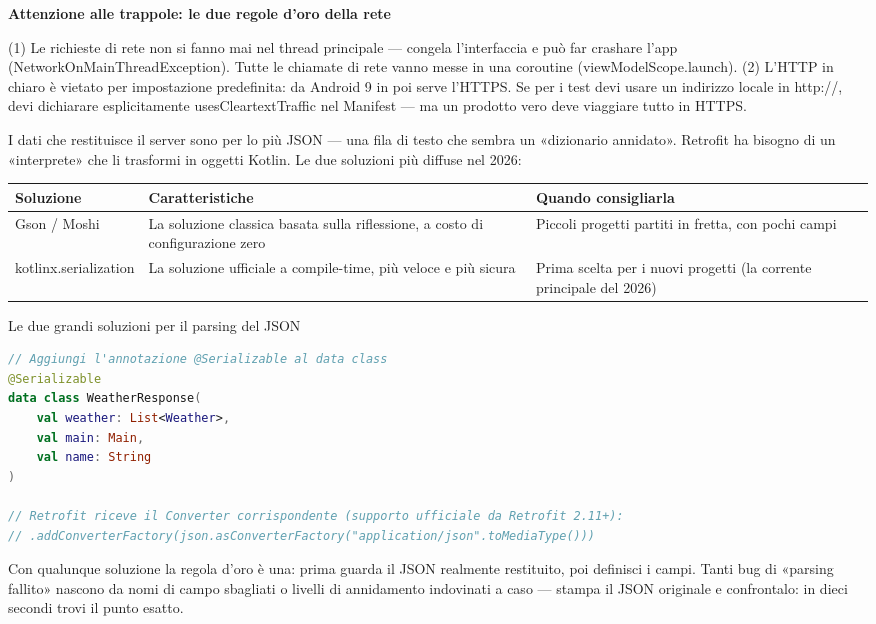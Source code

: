 \textbf{Attenzione alle trappole: le due regole d'oro della rete}\par

(1) Le richieste di rete non si fanno mai nel thread principale — congela l'interfaccia e può far crashare l'app (NetworkOnMainThreadException). Tutte le chiamate di rete vanno messe in una coroutine (viewModelScope.launch). (2) L'HTTP in chiaro è vietato per impostazione predefinita: da Android 9 in poi serve l'HTTPS. Se per i test devi usare un indirizzo locale in http://, devi dichiarare esplicitamente usesCleartextTraffic nel Manifest — ma un prodotto vero deve viaggiare tutto in HTTPS.


I dati che restituisce il server sono per lo più JSON — una fila di testo che sembra un «dizionario annidato». Retrofit ha bisogno di un «interprete» che li trasformi in oggetti Kotlin. Le due soluzioni più diffuse nel 2026:

\begin{center}
\begin{tabularx}{\linewidth}{|X|X|X|}
\hline
\textbf{Soluzione} & \textbf{Caratteristiche} & \textbf{Quando consigliarla} \tabularnewline
\hline
Gson / Moshi & La soluzione classica basata sulla riflessione, a costo di configurazione zero & Piccoli progetti partiti in fretta, con pochi campi \tabularnewline
kotlinx.serialization & La soluzione ufficiale a compile-time, più veloce e più sicura & Prima scelta per i nuovi progetti (la corrente principale del 2026) \tabularnewline
\hline
\end{tabularx}
\end{center}

\begin{center}\small\color{gray}Le due grandi soluzioni per il parsing del JSON\end{center}

\begin{lstlisting}[language=Kotlin]
// Aggiungi l'annotazione @Serializable al data class
@Serializable
data class WeatherResponse(
    val weather: List<Weather>,
    val main: Main,
    val name: String
)

// Retrofit riceve il Converter corrispondente (supporto ufficiale da Retrofit 2.11+):
// .addConverterFactory(json.asConverterFactory("application/json".toMediaType()))
\end{lstlisting}

Con qualunque soluzione la regola d'oro è una: prima guarda il JSON realmente restituito, poi definisci i campi. Tanti bug di «parsing fallito» nascono da nomi di campo sbagliati o livelli di annidamento indovinati a caso — stampa il JSON originale e confrontalo: in dieci secondi trovi il punto esatto.

